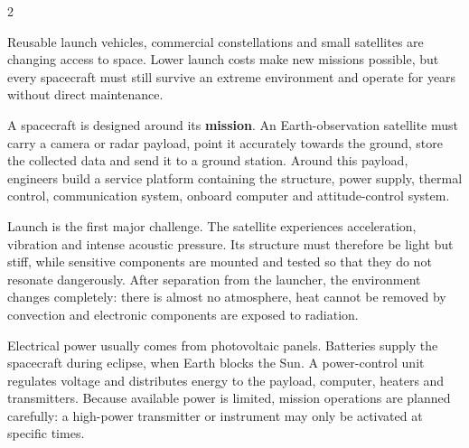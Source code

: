 

\begin{multicols}{2}
\begin{engineeringnews}
Reusable launch vehicles, commercial constellations and small satellites are changing access to space. Lower launch costs make new missions possible, but every spacecraft must still survive an extreme environment and operate for years without direct maintenance.
\end{engineeringnews}

\begin{ecarticle}
A spacecraft is designed around its \textbf{mission}. An Earth-observation satellite must carry a camera or radar payload, point it accurately towards the ground, store the collected data and send it to a ground station. Around this payload, engineers build a service platform containing the structure, power supply, thermal control, communication system, onboard computer and attitude-control system.

Launch is the first major challenge. The satellite experiences acceleration, vibration and intense acoustic pressure. Its structure must therefore be light but stiff, while sensitive components are mounted and tested so that they do not resonate dangerously. After separation from the launcher, the environment changes completely: there is almost no atmosphere, heat cannot be removed by convection and electronic components are exposed to radiation.

Electrical power usually comes from photovoltaic panels. Batteries supply the spacecraft during eclipse, when Earth blocks the Sun. A power-control unit regulates voltage and distributes energy to the payload, computer, heaters and transmitters. Because available power is limited, mission operations are planned carefully: a high-power transmitter or instrument may only be activated at specific times.


\end{ecarticle}
\end{multicols}
